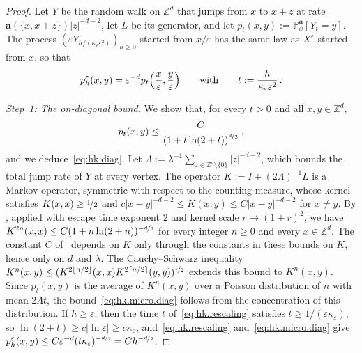 \documentclass[11pt]{amsart}
\numberwithin{equation}{section}
\newcommand{\Z}{\mathbb{Z}}
\newcommand{\PP}{\mathbb{P}}
\newcommand{\ba}{\mathbf{a}}
\newcommand{\eps}{\varepsilon}
\newcommand{\nf}{\nicefrac}
\begin{document}
\begin{proof}
Let $Y$ be the random walk on $\Z^d$ that jumps from $x$ to $x + z$ at rate $\ba(\{x, x+z\}) |z|^{-d-2}$, let $L$ be its generator, and let $p_t(x,y) := \PP^\ba_x[Y_t = y]$.
The process $(\eps Y_{h/(\kappa_\eps \eps^2)})_{h \geq 0}$ started from $x/\eps$ has the same law as $X^\eps$ started from $x$, so that
\begin{equation} \label{eq:hk.rescaling}
    p^\eps_h(x,y) = \eps^{-d} p_t \Bigl( \frac{x}{\eps}, \frac{y}{\eps} \Bigr) \qquad \text{with} \qquad t := \frac{h}{\kappa_\eps \eps^2}\,.
\end{equation}

\smallskip

\emph{Step~1: The on-diagonal bound.}
We show that, for every $t > 0$ and all $x, y \in \Z^d$,
\begin{equation} \label{eq:hk.micro.diag}
    p_t(x, y) \leq \frac{C}{\left(1 + t \ln (2 + t) \right)^{\nf{d}{2}}}\,,
\end{equation}
and we deduce~\eqref{eq:hk.diag}.
Let $\Lambda := \lambda^{-1} \sum_{z \in \Z^d \setminus \{0\}} |z|^{-d-2}$, which bounds the total jump rate of $Y$ at every vertex.
The operator $K := I + (2 \Lambda)^{-1} L$ is a Markov operator, symmetric with respect to the counting measure, whose kernel satisfies $K(x,x) \geq \nf12$ and $c |x-y|^{-d-2} \leq K(x,y) \leq C |x-y|^{-d-2}$ for $x \neq y$.
By \citet[Theorem~1.1]{MSC2015}, applied with escape time exponent $2$ and kernel scale $r \mapsto (1+r)^2$, we have $K^{2n}(x,x) \leq C (1 + n \ln(2+n))^{-\nf{d}{2}}$ for every integer $n \geq 0$ and every $x \in \Z^d$.
The constant $C$ of~\citet{MSC2015} depends on $K$ only through the constants in these bounds on $K$, hence only on $d$ and $\lambda$.
The Cauchy--Schwarz inequality $K^n(x,y) \leq (K^{2 \lfloor n/2 \rfloor}(x,x) K^{2 \lceil n/2 \rceil}(y,y))^{\nf12}$ extends this bound to $K^n(x,y)$.
Since $p_t(x,y)$ is the average of $K^n(x,y)$ over a Poisson distribution of $n$ with mean $2 \Lambda t$, the bound~\eqref{eq:hk.micro.diag} follows from the concentration of this distribution.
If $h \geq \eps$, then the time $t$ of~\eqref{eq:hk.rescaling} satisfies $t \geq 1/(\eps \kappa_\eps)$, so $\ln(2 + t) \geq c |\ln \eps| \geq c \kappa_\eps$, and~\eqref{eq:hk.rescaling} and~\eqref{eq:hk.micro.diag} give $p^\eps_h(x,y) \leq C \eps^{-d} (t \kappa_\eps)^{-\nf{d}{2}} = C h^{-\nf{d}{2}}$.

\smallskip


\end{proof}
\end{document}
